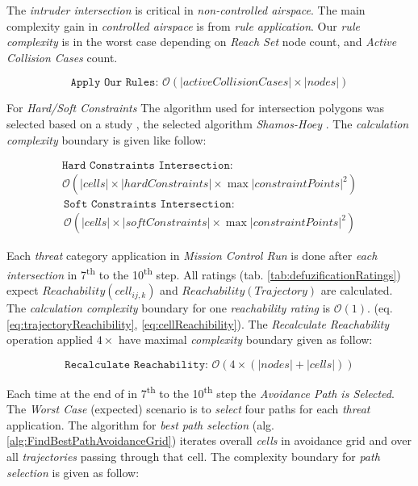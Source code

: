 \begin{note}
    The \emph{intruder intersection} is critical in \emph{non-controlled airspace}. The main complexity gain in \emph{controlled airspace} is from \emph{rule application}. Our \emph{rule complexity} is in the worst case depending on \emph{Reach Set} node count, and \emph{Active Collision Cases} count.
    
    \begin{equation*}
        \texttt{Apply Our Rules: } \mathscr{O}(|active Collision Cases| \times |nodes|)
    \end{equation*}
\end{note}

\newpage\noindent For \emph{Hard/Soft Constraints} The algorithm used for intersection polygons was selected based on a study \citep{bentley1979algorithms}, the selected algorithm  \emph{Shamos-Hoey} \cite{shamos1976geometric}. The \emph{calculation complexity} boundary is given like follow:

\begin{multline*}
    \texttt{Hard Constraints Intersection:}\\ \mathscr{O}(|cells|\times|hard Constraints| \times \max |constraint Points|^2)
\end{multline*}
\begin{multline*}
    \texttt{Soft Constraints Intersection:}\\ \mathscr{O}(|cells|\times|soft Constraints| \times \max |constraint Points|^2)
\end{multline*}

\noindent Each \emph{threat} category application in \emph{Mission Control Run} is done after \emph{each intersection} in 7\textsuperscript{th} to the  10\textsuperscript{th} step. All ratings (tab. \ref{tab:defuzificationRatings}) expect $Reachability(cell_{ij,k})$ and $Reachability(Trajectory)$  are calculated. The \emph{calculation complexity} boundary for one \emph{reachability rating} is $\mathscr{O}(1)$. (eq. \ref{eq:trajectoryReachibility}, \ref{eq:cellReachibility}). The \emph{Recalculate Reachability} operation applied $4\times$ have maximal \emph{complexity} boundary given as follow:

\begin{equation*}
    \texttt{Recalculate Reachability: } \mathscr{O}(4 \times (|nodes| + |cells|))
\end{equation*}

\noindent Each time at the end of in 7\textsuperscript{th} to the 10\textsuperscript{th} step the \emph{Avoidance Path is Selected}. The \emph{Worst Case} (expected) scenario is to \emph{select} four paths for each \emph{threat} application. The algorithm for \emph{best path selection} (alg. \ref{alg:FindBestPathAvoidanceGrid}) iterates overall \emph{cells} in avoidance grid and over all \emph{trajectories} passing through that cell. The complexity boundary for \emph{path selection} is given as follow:

